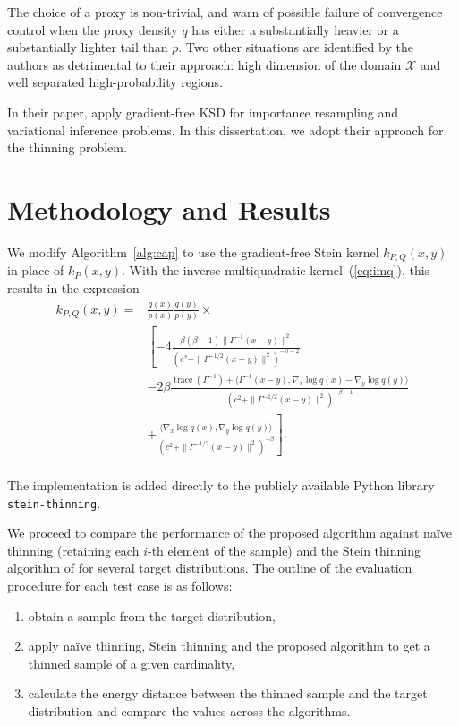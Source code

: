 \documentclass[11pt,a4paper]{report}
\DeclareMathOperator{\trace}{trace}
\begin{document}
The choice of a proxy is non-trivial, and \cite{fisherGradientFreeKernelStein2024} warn of possible failure of convergence control when the proxy density $q$ has either a substantially heavier or a substantially lighter tail than $p$. Two other situations are identified by the authors as detrimental to their approach: high dimension of the domain $\mathcal{X}$ and well separated high-probability regions.

In their paper, \cite{fisherGradientFreeKernelStein2024} apply gradient-free KSD for importance resampling and variational inference problems. In this dissertation, we adopt their approach for the thinning problem.

\chapter{Methodology and Results}

We modify Algorithm~\ref{alg:cap} to use the gradient-free Stein kernel $k_{P,Q}(x,y)$ in place of $k_P(x, y)$. With the inverse multiquadratic kernel~(\ref{eq:imq}), this results in the expression
\begin{equation*}
\begin{aligned}
k_{P,Q}(x, y)
= &\frac{q(x)}{p(x)} \frac{q(y)}{p(y)} \times \\
 &\left[ -4 \frac{\beta(\beta-1) \| \Gamma^{-1}(x - y)\|^2}{(c^2 + \| \Gamma^{-1/2}(x-y)\|^2)^{-\beta-2}} \right.  \\
&- 2 \beta \frac{\trace(\Gamma^{-1}) + \langle \Gamma^{-1} (x - y), \nabla_x \log q(x) - \nabla_y \log q(y)\rangle}{(c^2 + \| \Gamma^{-1/2}(x-y)\|^2)^{-\beta-1}} \\
& \left. + \frac{\langle \nabla_x \log q(x), \nabla_y \log q(y) \rangle}{(c^2 + \| \Gamma^{-1/2}(x-y)\|^2)^{-\beta}} \right]. \\
\end{aligned}
\label{eq:k_Q}
\end{equation*}

The implementation is added directly to the publicly available Python library \texttt{stein-thinning}.

We proceed to compare the performance of the proposed algorithm against na\"ive thinning (retaining each $i$-th element of the sample) and the Stein thinning algorithm of \cite{riabizOptimalThinningMCMC2022} for several target distributions. The outline of the evaluation procedure for each test case is as follows:
\begin{enumerate}
\item obtain a sample from the target distribution,
\item apply na\"ive thinning, Stein thinning and the proposed algorithm to get a thinned sample of a given cardinality,
\item calculate the energy distance between the thinned sample and the target distribution and compare the values across the algorithms.
\end{enumerate}
\end{document}
